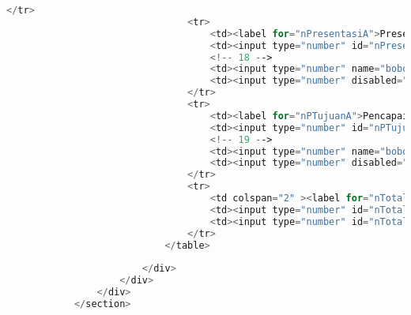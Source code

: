 \begin{lstlisting}[language=PHP,basicstyle=\tiny,caption=skripsi.php]
								</tr>
								<tr>
									<td><label for="nPresentasiA">Presentasi</label></td>
									<td><input type="number" id="nPresentasiA" max="100" ng-model="nilai_PresentasiA" class="form-nilai"/></td>
									<!-- 18 -->
									<td><input type="number" name="bobotPresentasiAnggota" ng-model="presentasiA.value" ng-init="presentasiA.value = 15" min="0" max="100" class="form-nilai" readonly="readonly" /></td>
									<td><input type="number" disabled="disabled" value="{{nilai_PresentasiA * presentasiA.value / 100}}" ng-model="total_PresentasiA" class="form-nilai"/></td>
								</tr>
								<tr>
									<td><label for="nPTujuanA">Pencapaian Tujuan</label></td>
									<td><input type="number" id="nPTujuanA" max="100" ng-model="nilai_PTujuanA" class="form-nilai"/></td>
									<!-- 19 -->
									<td><input type="number" name="bobotPencapaianTujuanAnggota" ng-model="PTujuanA.value" ng-init="PTujuanA.value = 30" min="0" max="100" class="form-nilai" readonly="readonly" /></td>
									<td><input type="number" disabled="disabled" value="{{nilai_PTujuanA * PTujuanA.value / 100}}" ng-model="total_PTujuanA" class="form-nilai"/></td>
								</tr>
								<tr>
									<td colspan="2" ><label for="nTotalBobotA">Total</label></td>
									<td><input type="number" id="nTotalBobotA" max="100" disabled="disabled" value={{TTLaporanA.value+KMateriA.value+PMateriA.value+presentasiA.value+PTujuanA.value}} class="form-nilai"/></td>
									<td><input type="number" id="nTotalAnggota" ng-model="nTotalAnggota" max="100" class="form-nilai" value= "{{nilai_TTLaporanA * TTLaporanA.value / 100 + nilai_KMateriA * KMateriA.value / 100 + nilai_PMateriA * PMateriA.value / 100 + nilai_PresentasiA * presentasiA.value / 100 + nilai_PTujuanA * PTujuanA.value / 100}}" disabled="disabled" /></td>
								</tr>
							</table>
							
						</div>
					</div>
				</div>
			</section>
			

\end{lstlisting}
